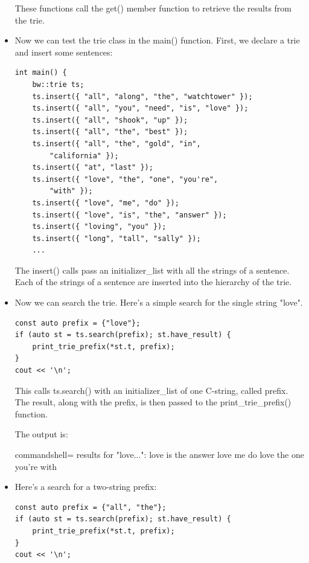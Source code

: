 \begin{itemize}
These functions call the get() member function to retrieve the results from the trie.

\item 
Now we can test the trie class in the main() function. First, we declare a trie and insert some sentences:

\begin{lstlisting}[style=styleCXX]
int main() {
	bw::trie ts;
	ts.insert({ "all", "along", "the", "watchtower" });
	ts.insert({ "all", "you", "need", "is", "love" });
	ts.insert({ "all", "shook", "up" });
	ts.insert({ "all", "the", "best" });
	ts.insert({ "all", "the", "gold", "in",
		"california" });
	ts.insert({ "at", "last" });
	ts.insert({ "love", "the", "one", "you're",
		"with" });
	ts.insert({ "love", "me", "do" });
	ts.insert({ "love", "is", "the", "answer" });
	ts.insert({ "loving", "you" });
	ts.insert({ "long", "tall", "sally" });
	...
\end{lstlisting}

The insert() calls pass an initializer\_list with all the strings of a sentence. Each of the strings of a sentence are inserted into the hierarchy of the trie.

\item 
Now we can search the trie. Here's a simple search for the single string "love".

\begin{lstlisting}[style=styleCXX]
const auto prefix = {"love"};
if (auto st = ts.search(prefix); st.have_result) {
	print_trie_prefix(*st.t, prefix);
}
cout << '\n';
\end{lstlisting}

This calls ts.search() with an initializer\_list of one C-string, called prefix. The result, along with the prefix, is then passed to the print\_trie\_prefix() function.

The output is:

\begin{tcblisting}{commandshell={}}
results for "love...":
love is the answer
love me do
love the one you're with
\end{tcblisting}

\item
Here's a search for a two-string prefix:

\begin{lstlisting}[style=styleCXX]
const auto prefix = {"all", "the"};
if (auto st = ts.search(prefix); st.have_result) {
	print_trie_prefix(*st.t, prefix);
}
cout << '\n';
\end{lstlisting}


\end{itemize}
